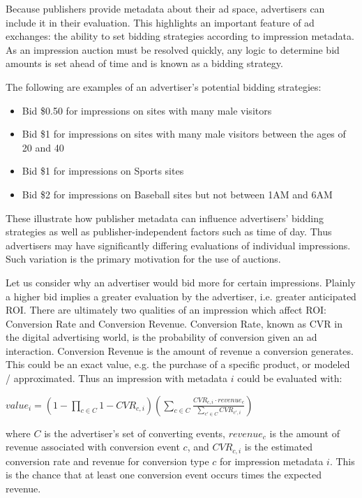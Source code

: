 \documentclass{article}
\begin{document}
Because publishers provide metadata about their ad space, advertisers can include it in their evaluation. This highlights an important feature of ad exchanges: the ability to set bidding strategies according to impression metadata. As an impression auction must be resolved quickly, any logic to determine bid amounts is set ahead of time and is known as a bidding strategy.

The following are examples of an advertiser's potential bidding strategies:

\begin{itemize}
\item Bid \$0.50 for impressions on sites with many male visitors
\item Bid \$1 for impressions on sites with many male visitors between the ages of 20 and 40
\item Bid \$1 for impressions on Sports sites
\item Bid \$2 for impressions on Baseball sites but not between 1AM and 6AM
\end{itemize}

These illustrate how publisher metadata can influence advertisers' bidding strategies as well as publisher-independent factors such as time of day. Thus advertisers may have significantly differing evaluations of individual impressions. Such variation is the primary motivation for the use of auctions.

Let us consider why an advertiser would bid more for certain impressions. Plainly a higher bid implies a greater evaluation by the advertiser, i.e. greater anticipated ROI. There are ultimately two qualities of an impression which affect ROI: Conversion Rate and Conversion Revenue. Conversion Rate, known as CVR in the digital advertising world, is the probability of conversion given an ad interaction. Conversion Revenue is the amount of revenue a conversion generates. This could be an exact value, e.g. the purchase of a specific product, or modeled / approximated. Thus an impression with metadata $i$ could be evaluated with:

$ value_{i} = (1-\prod_{c \in C} 1-CVR_{c,i} ) (\sum_{c\in C} \frac{CVR_{c,i} \cdot revenue_{c}}{\sum_{c' \in C} CVR_{c',i}}) $
 
\noindent where $C$ is the advertiser's set of converting events, $revenue_{c}$ is the amount of revenue associated with conversion event $c$, and $CVR_{c,i}$ is the estimated conversion rate and revenue for conversion type $c$ for impression metadata $i$. This is the chance that at least one conversion event occurs times the expected revenue.
\end{document}
